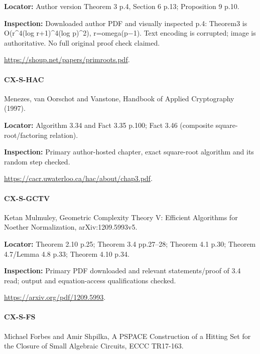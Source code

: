 \documentclass[11pt,a4paper]{article}
\begin{document}
\textbf{Locator:} Author version Theorem 3 p.\allowbreak{}4, Section 6 p.\allowbreak{}13; Proposition 9 p.\allowbreak{}10.

\textbf{Inspection:} Downloaded author PDF and visually inspected p.\allowbreak{}4:\allowbreak{} Theorem3 is O(r\textasciicircum{}4(log r+1)\textasciicircum{}4(log p)\textasciicircum{}2), r=omega(p\ensuremath{-}1).\allowbreak{} Text encoding is corrupted; image is authoritative.\allowbreak{} No full original proof check claimed.\allowbreak{}

\url{https://shoup.net/papers/primroots.pdf}.

\paragraph{CX-S-HAC} Menezes, van Oorschot and Vanstone, Handbook of Applied Cryptography (1997).

\textbf{Locator:} Algorithm 3.\allowbreak{}34 and Fact 3.\allowbreak{}35 p.\allowbreak{}100; Fact 3.\allowbreak{}46 (composite square-root/\allowbreak{}factoring relation).

\textbf{Inspection:} Primary author-hosted chapter, exact square-root algorithm and its random step checked.\allowbreak{}

\url{https://cacr.uwaterloo.ca/hac/about/chap3.pdf}.

\paragraph{CX-S-GCTV} Ketan Mulmuley, Geometric Complexity Theory V:\allowbreak{} Efficient Algorithms for Noether Normalization, arXiv:\allowbreak{}1209.\allowbreak{}5993v5.

\textbf{Locator:} Theorem 2.\allowbreak{}10 p.\allowbreak{}25; Theorem 3.\allowbreak{}4 pp.\allowbreak{}27–\allowbreak{}28; Theorem 4.\allowbreak{}1 p.\allowbreak{}30; Theorem 4.\allowbreak{}7/\allowbreak{}Lemma 4.\allowbreak{}8 p.\allowbreak{}33; Theorem 4.\allowbreak{}10 p.\allowbreak{}34.

\textbf{Inspection:} Primary PDF downloaded and relevant statements/\allowbreak{}proof of 3.\allowbreak{}4 read; output and equation-access qualifications checked.\allowbreak{}

\url{https://arxiv.org/pdf/1209.5993}.

\paragraph{CX-S-FS} Michael Forbes and Amir Shpilka, A PSPACE Construction of a Hitting Set for the Closure of Small Algebraic Circuits, ECCC TR17-163.
\end{document}

